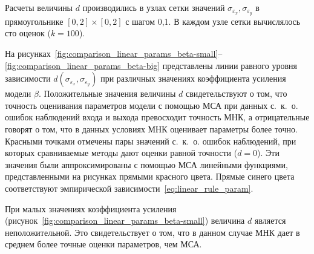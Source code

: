 Расчеты величины \( d \) производились в узлах сетки значений
\( \sigma_{\varepsilon_x}, \sigma_{\varepsilon_y} \) в прямоугольнике
\( [0, 2] \times [0, 2] \) с шагом 0{,}1.
В каждом узле сетки вычислялось сто оценок (\( k = 100 \)).

На рисунках~\ref{fig:comparison_linear_params_beta-small}--\ref{fig:comparison_linear_params_beta-big}
представлены линии равного уровня зависимости \( d(\sigma_{\varepsilon_x}, \sigma_{\varepsilon_y}) \)
при различных значениях коэффициента усиления модели \( \beta \).
Положительные значения величины \( d \) свидетельствуют о том,
что точность оценивания параметров модели с помощью МСА при данных с.~к.~о.
ошибок наблюдений входа и выхода превосходит точность МНК,
а отрицательные говорят о том, что в данных условиях МНК оценивает параметры более точно.
Красными точками отмечены пары значений с.~к.~о. ошибок наблюдений,
при которых сравниваемые методы дают оценки равной точности (\( d = 0 \)).
Эти значения были аппроксимированы с помощью МСА линейными функциями,
представленными на рисунках прямыми красного цвета.
Прямые синего цвета соответствуют эмпирической зависимости~\eqref{eq:linear_rule_param}.

При малых значениях коэффициента усиления
(рисунок~\ref{fig:comparison_linear_params_beta-small})
величина \( d \) является неположительной.
Это свидетельствует о том, что в данном случае МНК дает в
среднем более точные оценки параметров, чем МСА.

